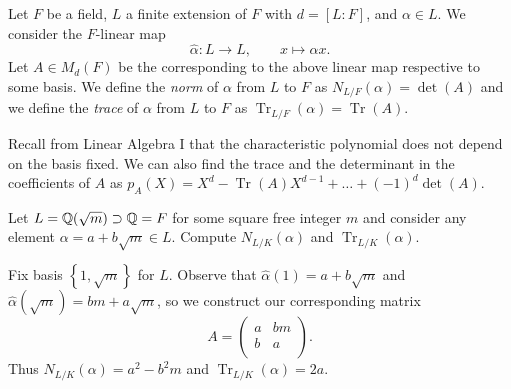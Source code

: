 
\begin{definition}
	Let $F$ be a field, $L$ a finite extension of $F$
	with $d = [L:F]$, and $\alpha \in L$.
	We consider the $F$-linear map
	\[
		\hat\alpha: L \to L, \qquad 
		x \mapsto \alpha x.
	\]
	Let $A \in M_d(F)$ be the corresponding to the above linear map
	respective to some basis.
	We define the \emph{norm} of $\alpha$ from $L$ to $F$ as
	$N_{L/F}(\alpha) = \det(A)$
	and we define the \emph{trace} of $\alpha$ from $L$ to $F$ as
	$\operatorname{Tr}_{L/F}(\alpha) = \operatorname{Tr}(A)$.
\end{definition}

Recall from Linear Algebra I that the characteristic polynomial
does not depend on the basis fixed.
We can also find the trace and the determinant in the coefficients
of $A$ as
$
	p_A(X) 
	= X^d 
		- \operatorname{Tr}(A) X^{d-1} 
		+ \ldots + (-1)^d \det(A)
$.

\begin{problem}
	Let $L = \mathbb{Q}(\sqrt m) \supset \mathbb{Q} = F$ for some square free integer
	$m$ and consider any element
	$\alpha = a + b\sqrt m \in L$.
	Compute $N_{L/K}(\alpha)$ and $\operatorname{Tr}_{L/K}(\alpha)$.
\end{problem}

\begin{solution}
	Fix basis $ \left\{ 1, \sqrt m \right\} $
	for $L$. 
	Observe that $\hat\alpha(1) = a + b\sqrt m$
	and $\hat\alpha(\sqrt m) = bm + a\sqrt m$, 
	so we construct our corresponding matrix
	\[
		A =
		\begin{pmatrix}
			a & bm \\
			b & a \\
		\end{pmatrix}
		.
	\]
	Thus $N_{L/K}(\alpha) = a^2 - b^2m$
	and $\operatorname{Tr}_{L/K}(\alpha) = 2a$.
\end{solution}

